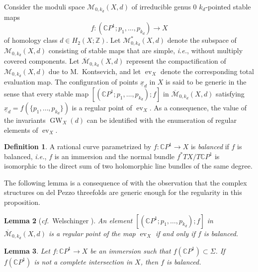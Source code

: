 \documentclass[10pt,a4paper]{article}
\numberwithin{equation}{section}
\theoremstyle{definition}
\newtheorem{definition}{Definition}[section]
\theoremstyle{plain}
\newtheorem{lemma}[definition]{Lemma}
\theoremstyle{remark}
\newcommand{\Z}{\mathbb{Z}}
\newcommand{\C}{\mathbb{C}}
\DeclareMathOperator{\GW}{GW}
\DeclareMathOperator{\ev}{ev}
\newcommand{\lra}{\longrightarrow}
\begin{document}
Consider the moduli space $\mathcal{M}_{0,k_d}(X,d)$  of irreducible genus $0$ $k_d$-pointed stable maps
$$f\colon \left(\mathbb{C}P^1;p_1,\ldots,p_{k_d}\right)\lra X$$
of homology class $d\in H_2(X;\Z)$. Let $\mathcal{M}^*_{0,k_d}(X,d)$ denote the subspace of $\mathcal{M}_{0,k_d}(X,d)$ consisting of  
stable maps  that are simple, \textit{i.e.}, without multiply covered components. Let $\overline{\mathcal{M}}_{0,k_d}(X,d)$ represent the compactification of  $\mathcal{M}_{0,k_d}(X,d)$ due to M.~Kontsevich, and let $\ev_X$ denote the corresponding total evaluation map. The configuration of points $\underline{x}_d$ in $X$ is said to be generic in the sense that every stable map $[(\C P^1;p_1,\ldots,p_{k_d});f]$ in $\overline{\mathcal{M}}_{0,k_d}(X,d)$ satisfying   $\underline{x}_d=f(\{p_1,\ldots,p_{k_d}\})$ is a regular point of  $\ev_{X}$. As a consequence, the value of the invariants $\GW_X(d)$ can be identified with the enumeration of regular elements of $\ev_{X}$.

\begin{definition}
A rational curve parametrized by $f\colon \C P^1\to X$  is \emph{balanced} if $f$ is balanced, \textit{i.e.}, $f$ is an immersion and the normal bundle  $f^*TX/T\C P^1$ is isomorphic to the direct sum of two holomorphic line bundles of the same degree.
\end{definition}

The following lemma is a consequence of \cite[Proposition 2.2]{welschinger2005stongly} with the observation that the complex structures on del Pezzo threefolds are generic enough for the regularity in this proposition. 

\begin{lemma}[\textit{cf.}~Welschinger \cite{welschinger2005stongly}] \label{Lemma-Regular.Balanced} 
An element $[(\C P^1;p_1,\ldots,p_{k_d});f]$ in $\overline{\mathcal{M}}_{0,k_d}(X,d)$ is a regular point of the map $\ev_{X}$ if and only if $f$ is balanced.
\end{lemma}

 \begin{lemma} \label{Lemma-not.intersection.balanced}
  Let $f\colon \mathbb{C}P^1\to X$ be an immersion such that $f(\C P^1)\subset \Sigma$. If $f(\C P^1)$ is not a complete intersection in $X$, then $f$ is balanced.
   \end{lemma}    
\end{document}
